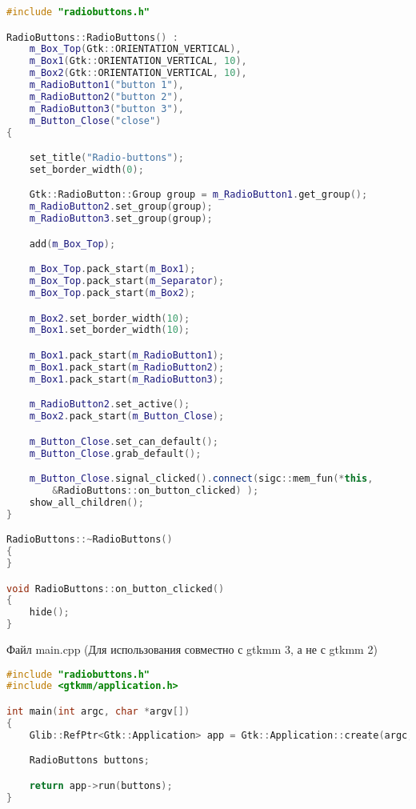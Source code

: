 \begin{lstlisting}[language=C++]
#include "radiobuttons.h"

RadioButtons::RadioButtons() :
	m_Box_Top(Gtk::ORIENTATION_VERTICAL),
	m_Box1(Gtk::ORIENTATION_VERTICAL, 10),
	m_Box2(Gtk::ORIENTATION_VERTICAL, 10),
	m_RadioButton1("button 1"),
	m_RadioButton2("button 2"),
	m_RadioButton3("button 3"),
	m_Button_Close("close")
{

	set_title("Radio-buttons");
	set_border_width(0);

	Gtk::RadioButton::Group group = m_RadioButton1.get_group();
	m_RadioButton2.set_group(group);
	m_RadioButton3.set_group(group);

	add(m_Box_Top);

	m_Box_Top.pack_start(m_Box1);
	m_Box_Top.pack_start(m_Separator);
	m_Box_Top.pack_start(m_Box2);

	m_Box2.set_border_width(10);
	m_Box1.set_border_width(10);

	m_Box1.pack_start(m_RadioButton1);
	m_Box1.pack_start(m_RadioButton2);
	m_Box1.pack_start(m_RadioButton3);

	m_RadioButton2.set_active();
	m_Box2.pack_start(m_Button_Close);

	m_Button_Close.set_can_default();
	m_Button_Close.grab_default();

	m_Button_Close.signal_clicked().connect(sigc::mem_fun(*this,
		&RadioButtons::on_button_clicked) );
	show_all_children();
}

RadioButtons::~RadioButtons()
{
}

void RadioButtons::on_button_clicked()
{
	hide(); 
}

\end{lstlisting}
Файл main.cpp (Для использования совместно с gtkmm 3, а не с gtkmm 2) 
\begin{lstlisting}[language=C++]
#include "radiobuttons.h"
#include <gtkmm/application.h>

int main(int argc, char *argv[])
{
	Glib::RefPtr<Gtk::Application> app = Gtk::Application::create(argc, argv, 		"org.gtkmm.example");

	RadioButtons buttons;

	return app->run(buttons);
}

\end{lstlisting}


